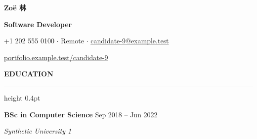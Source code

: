 \documentclass[10pt,a4paper]{article}
\newcommand{\atsHeaderToSection}{6.5pt}
\newcommand{\atsHeadingToContent}{2pt}
\newcommand{\atsRoleToMetadata}{1pt}
\newcommand{\atsfirstsection}[1]{%
  \vspace{\atsHeaderToSection}%
  {\noindent\large\bfseries\uppercase{#1}}\par
  \vspace{1.5pt}\hrule height 0.4pt\vspace{\atsHeadingToContent}%
}
\begin{document}
{\centering
  {\Huge \textbf{Zoë 林}}\par
  \vspace{3pt}
  {\large \textbf{Software Developer}}\par
  \vspace{3pt}
  {\small +1 202 555 0100 $\cdot$ Remote $\cdot$ \href{mailto:candidate-9@example.test}{candidate-9@example.test}}\par
  \vspace{2pt}
  {\small \href{https://portfolio.example.test/candidate-9}{portfolio.example.test/candidate-9}}\par
}

\atsfirstsection{Education}
\textbf{BSc in Computer Science} \hfill Sep 2018 -- Jun 2022\par
\vspace{\atsRoleToMetadata}
{\small\textit{Synthetic University 1}}\par
\end{document}
